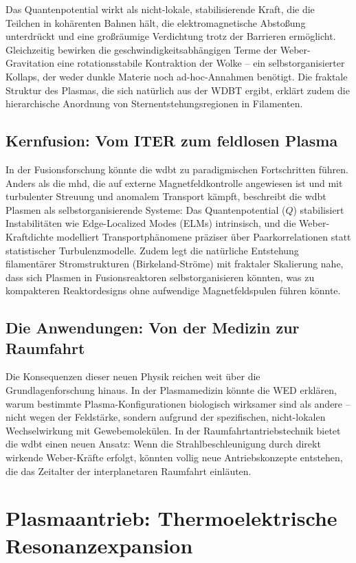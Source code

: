 Das Quantenpotential wirkt als nicht-lokale, stabilisierende Kraft, die die Teilchen in kohärenten Bahnen hält, die elektromagnetische Abstoßung unterdrückt und eine großräumige Verdichtung trotz
der Barrieren ermöglicht. Gleichzeitig bewirken die geschwindigkeitsabhängigen Terme der Weber-Gravitation eine rotationsstabile Kontraktion der Wolke – ein selbstorganisierter Kollaps, der weder
dunkle Materie noch ad-hoc-Annahmen benötigt. Die fraktale Struktur des Plasmas, die sich natürlich aus der WDBT ergibt, erklärt zudem die hierarchische Anordnung von Sternentstehungsregionen in
Filamenten.

\subsection{Kernfusion: Vom ITER zum feldlosen Plasma}
In der Fusionsforschung könnte die \gls{wdbt} zu paradigmischen Fortschritten führen. Anders als die \gls{mhd}, die auf externe Magnetfeldkontrolle angewiesen ist und mit turbulenter Streuung und
anomalem Transport kämpft, beschreibt die \gls{wdbt} Plasmen als selbstorganisierende Systeme: Das Quantenpotential ($Q$) stabilisiert Instabilitäten wie Edge-Localized Modes (ELMs) intrinsisch,
und die Weber-Kraftdichte modelliert Transportphänomene präziser über Paarkorrelationen statt statistischer Turbulenzmodelle. Zudem legt die natürliche Entstehung filamentärer Stromstrukturen (Birkeland-Ströme)
mit fraktaler Skalierung nahe, dass sich Plasmen in Fusionsreaktoren selbstorganisieren könnten, was zu kompakteren Reaktordesigns ohne aufwendige Magnetfeldspulen führen könnte.

\subsection{Die Anwendungen: Von der Medizin zur Raumfahrt}
Die Konsequenzen dieser neuen Physik reichen weit über die Grundlagenforschung hinaus. In der Plasmamedizin könnte die WED erklären, warum bestimmte Plasma-Konfigurationen biologisch wirksamer sind
als andere – nicht wegen der Feldstärke, sondern aufgrund der spezifischen, nicht-lokalen Wechselwirkung mit Gewebemolekülen. In der Raumfahrtantriebstechnik bietet die \gls{wdbt} einen neuen Ansatz:
Wenn die Strahlbeschleunigung durch direkt wirkende Weber-Kräfte erfolgt, könnten vollig neue Antriebskonzepte entstehen, die das Zeitalter der interplanetaren Raumfahrt einläuten.

\section{Plasmaantrieb: Thermoelektrische Resonanzexpansion}
\label{sec:hybrid_antrieb}

